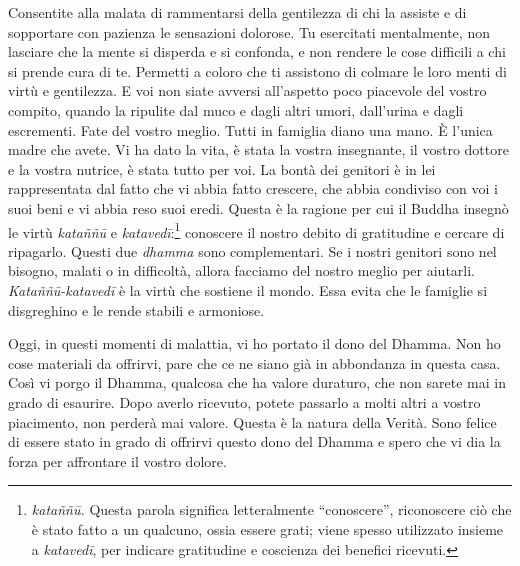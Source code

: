 Consentite alla malata di rammentarsi della gentilezza di chi la assiste
e di sopportare con pazienza le sensazioni dolorose. Tu esercitati
mentalmente, non lasciare che la mente si disperda e si confonda, e non
rendere le cose difficili a chi si prende cura di te. Permetti a coloro
che ti assistono di colmare le loro menti di virtù e gentilezza. E voi
non siate avversi all'aspetto poco piacevole del vostro compito, quando
la ripulite dal muco e dagli altri umori, dall'urina e dagli escrementi.
Fate del vostro meglio. Tutti in famiglia diano una mano. È l'unica
madre che avete. Vi ha dato la vita, è stata la vostra insegnante, il
vostro dottore e la vostra nutrice, è stata tutto per voi. La bontà dei
genitori è in lei rappresentata dal fatto che vi abbia fatto crescere,
che abbia condiviso con voi i suoi beni e vi abbia reso suoi eredi.
Questa è la ragione per cui il Buddha insegnò le virtù \emph{kataññū} e
\emph{katavedī}:\footnote{\emph{kataññū.} Questa parola significa
  letteralmente ``conoscere'', riconoscere ciò che è stato fatto a un
  qualcuno, ossia essere grati; viene spesso utilizzato insieme a
  \emph{katavedī}, per indicare gratitudine e coscienza dei benefici
  ricevuti.} conoscere il nostro debito di gratitudine e cercare di
ripagarlo. Questi due \emph{dhamma} sono complementari. Se i nostri
genitori sono nel bisogno, malati o in difficoltà, allora facciamo del
nostro meglio per aiutarli. \emph{Kataññū-katavedī} è la virtù che
sostiene il mondo. Essa evita che le famiglie si disgreghino e le rende
stabili e armoniose.

Oggi, in questi momenti di malattia, vi ho portato il dono del Dhamma.
Non ho cose materiali da offrirvi, pare che ce ne siano già in
abbondanza in questa casa. Così vi porgo il Dhamma, qualcosa che ha
valore duraturo, che non sarete mai in grado di esaurire. Dopo averlo
ricevuto, potete passarlo a molti altri a vostro piacimento, non perderà
mai valore. Questa è la natura della Verità. Sono felice di essere stato
in grado di offrirvi questo dono del Dhamma e spero che vi dia la forza
per affrontare il vostro dolore.

